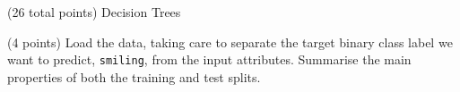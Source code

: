\documentclass[12pt]{article}
\begin{document}
\clearpage


\begin{question}{(26 total points) Decision Trees}





%
%
\begin{subquestion}{(4 points) Load the data, taking care to separate the target binary class label we want to predict, \texttt{smiling}, from the input attributes. 
Summarise the main properties of both the training and test splits. 
}



\end{subquestion}
\end{question}
\end{document}
